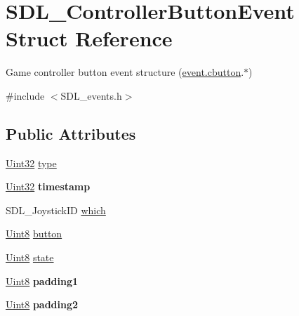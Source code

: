 \hypertarget{struct_s_d_l___controller_button_event}{}\section{S\+D\+L\+\_\+\+Controller\+Button\+Event Struct Reference}
\label{struct_s_d_l___controller_button_event}


Game controller button event structure (\hyperlink{union_s_d_l___event_aee2b5671c8dcdb447023715cc21593cb}{event.\+cbutton}.$\ast$)  




{\ttfamily \#include $<$S\+D\+L\+\_\+events.\+h$>$}

\subsection*{Public Attributes}
\begin{DoxyCompactItemize}
\item 
\hyperlink{_s_d_l__stdinc_8h_add440eff171ea5f55cb00c4a9ab8672d}{Uint32} \hyperlink{struct_s_d_l___controller_button_event_a09869d792031e47a88673d85915c209f}{type}
\item 
\hypertarget{struct_s_d_l___controller_button_event_a73003712734c4d2f966db3d7c2ce826b}{}\hyperlink{_s_d_l__stdinc_8h_add440eff171ea5f55cb00c4a9ab8672d}{Uint32} {\bfseries timestamp}\label{struct_s_d_l___controller_button_event_a73003712734c4d2f966db3d7c2ce826b}

\item 
S\+D\+L\+\_\+\+Joystick\+I\+D \hyperlink{struct_s_d_l___controller_button_event_a98777e88b5d5cae83eef16ffd4bcacc1}{which}
\item 
\hyperlink{_s_d_l__stdinc_8h_a2944638813a090aa23e62f4da842c3e2}{Uint8} \hyperlink{struct_s_d_l___controller_button_event_a039da6cd31c3c62e62a3ae17cc64d0db}{button}
\item 
\hyperlink{_s_d_l__stdinc_8h_a2944638813a090aa23e62f4da842c3e2}{Uint8} \hyperlink{struct_s_d_l___controller_button_event_a00c46683f86674c2a4f74404ee3e857c}{state}
\item 
\hypertarget{struct_s_d_l___controller_button_event_a34d3e43fc1994288b9b083c874bc0899}{}\hyperlink{_s_d_l__stdinc_8h_a2944638813a090aa23e62f4da842c3e2}{Uint8} {\bfseries padding1}\label{struct_s_d_l___controller_button_event_a34d3e43fc1994288b9b083c874bc0899}

\item 
\hypertarget{struct_s_d_l___controller_button_event_a8caf56a3921227913cfb652d5de1eec4}{}\hyperlink{_s_d_l__stdinc_8h_a2944638813a090aa23e62f4da842c3e2}{Uint8} {\bfseries padding2}\label{struct_s_d_l___controller_button_event_a8caf56a3921227913cfb652d5de1eec4}

\end{DoxyCompactItemize}


